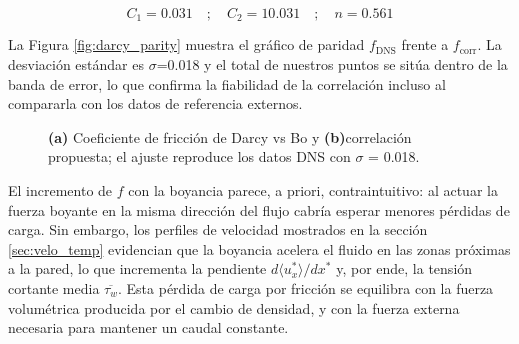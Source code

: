 \begin{small}
$$
C_1 = 0\text{.}031 \quad ; \quad C_2 = 10\text{.}031 \quad ; \quad n = 0\text{.}561
$$
\end{small}

La Figura \ref{fig:darcy_parity} muestra el gráfico de paridad $f_{\text{DNS}}$ frente a $f_{\text{corr}}$. La desviación estándar es $\sigma$=0.018 y el total de nuestros puntos se sitúa dentro de la banda de error, lo que confirma la fiabilidad de la correlación incluso al compararla con los datos de referencia externos.

\begin{figure}[H]
  \centering
  \caption{\textbf{(a)} Coeficiente de fricción de Darcy vs Bo y \textbf{(b)}correlación propuesta; el ajuste reproduce los datos DNS con $\sigma$ = 0.018.}
  \label{fig:nusselt}
\end{figure}

El incremento de $f$ con la boyancia parece, a priori, contraintuitivo: al actuar la fuerza boyante en la misma dirección del flujo cabría esperar menores pérdidas de carga. Sin embargo, los perfiles de velocidad mostrados en la sección \ref{sec:velo_temp} evidencian que la boyancia acelera el fluido en las zonas próximas a la pared, lo que incrementa la pendiente $d \langle u^*_x \rangle / dx^*$ y, por ende, la tensión cortante media $\overline{\tau_w}$. Esta pérdida de carga por fricción se equilibra con la fuerza volumétrica producida por el cambio de densidad, y con la fuerza externa necesaria para mantener un caudal constante.




